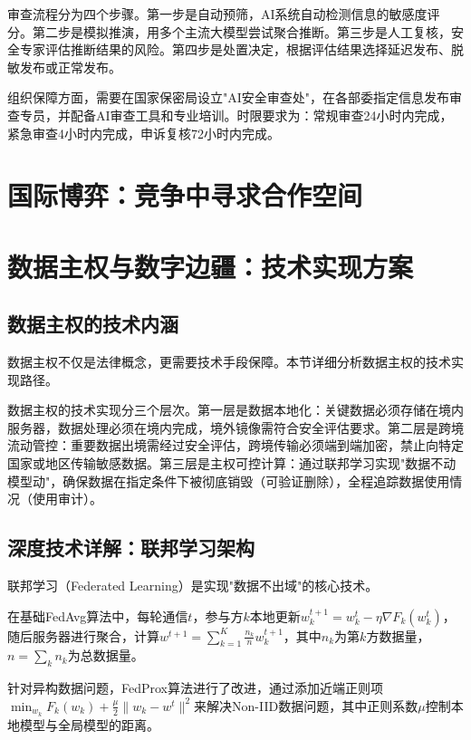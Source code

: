 审查流程分为四个步骤。第一步是自动预筛，AI系统自动检测信息的敏感度评分。第二步是模拟推演，用多个主流大模型尝试聚合推断。第三步是人工复核，安全专家评估推断结果的风险。第四步是处置决定，根据评估结果选择延迟发布、脱敏发布或正常发布。

组织保障方面，需要在国家保密局设立"AI安全审查处"，在各部委指定信息发布审查专员，并配备AI审查工具和专业培训。时限要求为：常规审查24小时内完成，紧急审查4小时内完成，申诉复核72小时内完成。

\section{国际博弈：竞争中寻求合作空间}


\section{数据主权与数字边疆：技术实现方案}

\subsection{数据主权的技术内涵}

数据主权不仅是法律概念，更需要技术手段保障。本节详细分析数据主权的技术实现路径\cite{DataSovereignty2024, EUDataAct2024, ChinaDataSecurity2024}。

数据主权的技术实现分三个层次。第一层是数据本地化：关键数据必须存储在境内服务器，数据处理必须在境内完成，境外镜像需符合安全评估要求。第二层是跨境流动管控：重要数据出境需经过安全评估，跨境传输必须端到端加密，禁止向特定国家或地区传输敏感数据。第三层是主权可控计算：通过联邦学习实现"数据不动模型动"，确保数据在指定条件下被彻底销毁（可验证删除），全程追踪数据使用情况（使用审计）。

\subsection{深度技术详解：联邦学习架构}

联邦学习（Federated Learning）是实现"数据不出域"的核心技术\cite{FederatedLearning2024, GoogleFL2024, FedAvg2024}。

在基础FedAvg算法中，每轮通信$t$，参与方$k$本地更新$w_k^{t+1} = w_k^t - \eta \nabla F_k(w_k^t)$，随后服务器进行聚合，计算$w^{t+1} = \sum_{k=1}^{K} \frac{n_k}{n} w_k^{t+1}$，其中$n_k$为第$k$方数据量，$n=\sum_k n_k$为总数据量。

针对异构数据问题，FedProx算法进行了改进，通过添加近端正则项$\min_{w_k} F_k(w_k) + \frac{\mu}{2} \|w_k - w^t\|^2$来解决Non-IID数据问题，其中正则系数$\mu$控制本地模型与全局模型的距离。

